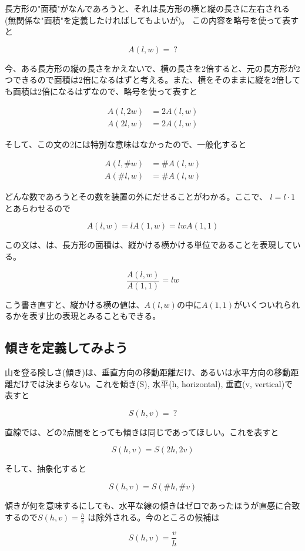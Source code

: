 \documentclass[dvipdfmx]{jsarticle}
\begin{document}
長方形の"面積"がなんであろうと、それは長方形の横と縦の長さに左右される(無関係な"面積"を定義したければしてもよいが)。 この内容を略号を使って表すと

\[A(l,w) =\ ?\]

今、ある長方形の縦の長さをかえないで、横の長さを2倍すると、元の長方形が2つできるので面積は2倍になるはずと考える。また、横をそのままに縦を2倍しても面積は2倍になるはずなので、略号を使って表すと

\begin{align*}
  A(l,2w) &= 2A(l,w) \\
  A(2l,w) &= 2A(l,w)
\end{align*}

そして、この文の2には特別な意味はなかったので、一般化すると

\begin{align*}
  A(l,\#w) &= \#A(l,w) \\
  A(\#l,w) &= \#A(l,w)
\end{align*}

どんな数であろうとその数を装置の外にだせることがわかる。ここで、 $l = l \cdot 1$ とあらわせるので

\[A(l,w) = lA(1,w) = lwA(1,1) \]

この文は、は、長方形の面積は、縦かける横かける単位であることを表現している。

\[ \frac{A(l,w)}{A(1,1)} = lw \]

こう書き直すと、縦かける横の値は、$A(l,w)の中にA(1,1)$がいくついれられるかを表す比の表現とみることもできる。

\subsection{傾きを定義してみよう}

山を登る険しさ(傾き)は、垂直方向の移動距離だけ、あるいは水平方向の移動距離だけでは決まらない。これを傾き(S), 水平(h, horizontal), 垂直(v, vertical)で表すと

\[ S(h,v) = \ ? \]

直線では、どの2点間をとっても傾きは同じであってほしい。これを表すと

\[ S(h,v) = S(2h, 2v) \]

そして、抽象化すると

\[ S(h,v) = S(\#h, \#v) \]

傾きが何を意味するにしても、水平な線の傾きはゼロであったほうが直感に合致するので$S(h,v) = \frac{h}{v}$ は除外される。今のところの候補は

\[ S(h,v) = \frac{v}{h} \]
\end{document}
